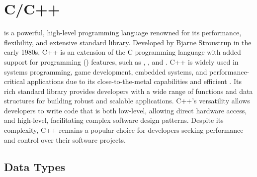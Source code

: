 \chapter{C/C++}
\thispagestyle{fancy}
\lstset{}\lstset{language=C++, style=cppstyle}

 is a powerful, high-level programming language renowned for its performance, flexibility, and extensive standard library. Developed by Bjarne Stroustrup in the early 1980s, C++ is an extension of the C programming language with added support for  programming () features, such as , , and . C++ is widely used in systems programming, game development, embedded systems, and performance-critical applications due to its close-to-the-metal capabilities and efficient . Its rich standard library provides developers with a wide range of functions and data structures for building robust and scalable applications. C++'s versatility allows developers to write code that is both low-level, allowing direct hardware access, and high-level, facilitating complex software design patterns. Despite its complexity, C++ remains a popular choice for developers seeking performance and control over their software projects.

\section{Data Types}

